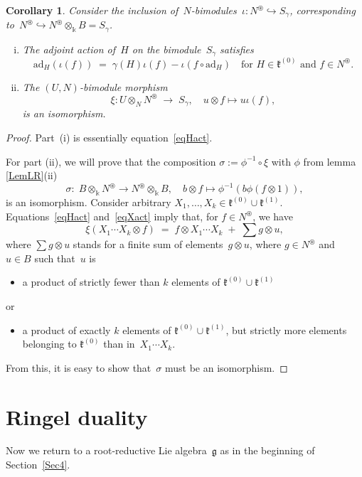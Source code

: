 \documentclass[11pt]{amsart}
\newcommand{\ad}{\mathrm{ad}}
\newcommand{\mk}{\Bbbk}
\newcommand{\fg}{\mathfrak{g}}
\newcommand{\fk}{\mathfrak{k}}
\numberwithin{equation}{section}
\theoremstyle{plain}
\newtheorem{cor}[subsubsection]{Corollary}
\theoremstyle{remark}
\theoremstyle{remark}
\theoremstyle{construction}
\begin{document}
\begin{cor}\label{CorAdH}
Consider the inclusion of~$N$-bimodules~$\iota: N^{\circledast}\hookrightarrow S_\gamma$, corresponding to~$N^{\circledast}\hookrightarrow N^{\circledast}\otimes_{\mk}B=S_\gamma$.
\begin{enumerate}[(i)]
\item The adjoint action of~$H$ on the bimodule~$S_\gamma$ satisfies
$$\ad_H(\iota(f))\;=\;\gamma(H)\iota(f)-\iota(f\circ \ad_H)\quad\mbox{for~$H\in\fk^{(0)}$ and~$f\in N^{\circledast}$.}$$
\item The $(U,N)$-bimodule morphism 
$$\xi:U\otimes_N N^{\circledast}\;\to\;S_\gamma,\quad u\otimes f\mapsto u\iota(f),$$
is an isomorphism.
\end{enumerate}
\end{cor}
\begin{proof}
Part~(i) is essentially equation~\eqref{eqHact}.

For part (ii), we will prove that the composition $\sigma:=\phi^{-1}\circ\xi$ with $\phi$ from lemma \ref{LemLR}(ii)
$$\sigma:\;B\otimes_{\mk}N^{\circledast}\to N^{\circledast}\otimes_{\mk}B,\quad b\otimes f\mapsto \phi^{-1}(b\phi(f\otimes 1)),$$
is an isomorphism.
Consider arbitrary $X_1,\ldots, X_k\in \fk^{(0)}\cup\fk^{(1)}$. Equations~\eqref{eqHact} and~\eqref{eqXact} imply that, for $f\in N^\circledast$, we have
$$\xi(X_1\cdots X_k\otimes f)\;=\; f\otimes X_1\cdots X_k\;+\;\sum g\otimes u,$$
where $\sum g\otimes u$ stands for a finite sum of elements~$g\otimes u$, where $g\in N^{\circledast}$ and~$u\in B$ such that~$u$ is
\begin{itemize}
\item a product of strictly fewer than $k$ elements of $\fk^{(0)}\cup\fk^{(1)}$
\end{itemize}
{or}
\begin{itemize}
\item a product of exactly $k$ elements of $\fk^{(0)}\cup\fk^{(1)}$, but strictly more elements belonging to $\fk^{(0)}$ than in~$X_1\cdots X_k$.
\end{itemize}
From this, it is easy to show that~$\sigma$ must be an isomorphism.
\end{proof}



\section{Ringel duality}
Now we return to {a} root-reductive Lie algebra~$\fg$ as in the beginning of Section~\ref{Sec4}.
\end{document}

